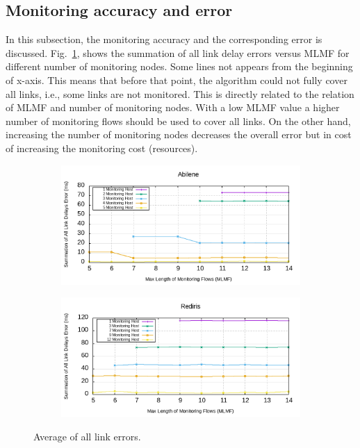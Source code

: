 \documentclass[10pt, journal, letterpaper]{IEEEtran}
\begin{document}
\subsection{Monitoring accuracy and error}\label{subsec:eval_accuracy_and_error}
In this subsection, the monitoring accuracy and the corresponding error is discussed. Fig.~\ref{fig:sum_delay_abilene}, shows the summation of all link delay errors versus MLMF for different number of monitoring nodes. Some lines not appears from the beginning of x-axis. This means that before that point, the algorithm could not fully cover all links, i.e., some links are not monitored. This is directly related to the relation of MLMF and number of monitoring nodes. With a low MLMF value a higher number of monitoring flows should be used to cover all links. On the other hand, increasing the number of monitoring nodes decreases the overall error but in cost of increasing the monitoring cost (resources).
\begin{figure}
    \begin{subfigure}{0.49\columnwidth}
       \centering
        \includegraphics[width=\columnwidth]{img/eval_Abilene_Max_Length_of_Summation_of_All_Links_Error.png}
    \end{subfigure}
    \begin{subfigure}{0.49\columnwidth}
      \centering
      \includegraphics[width=\columnwidth]{img/eval_Rediris_Max_Length_of_Summation_of_All_Links_Error.png}
    \end{subfigure}
    \caption{Average of all link errors.}
    \label{fig:sum_delay_abilene}
\end{figure} 
\end{document}
